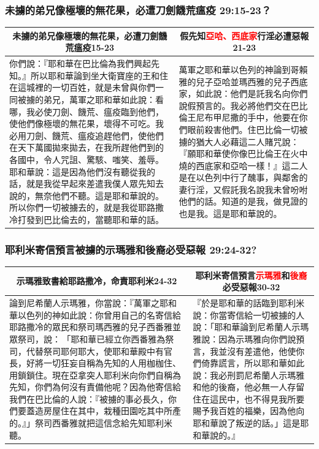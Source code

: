 \subsubsection{未擄的弟兄像極壞的無花果，必遭刀劍饑荒瘟疫 29:15-23？}
\begin{table}[H]
\centering
\begin{tabular}{p{9.75cm}|p{7.50cm}}\hline\hline
\multicolumn{1}{c|}{未擄的弟兄像極壞的無花果，必遭刀劍饑荒瘟疫15-23}&\multicolumn{1}{c}{假先知\textcolor{red}{亞哈、西底家}行淫必遭惡報21-23}\\\hline
你們說：『耶和華在巴比倫為我們興起先知。』所以耶和華論到坐大衛寶座的王和住在這城裡的一切百姓，就是未曾與你們一同被擄的弟兄，萬軍之耶和華如此說：看哪，我必使刀劍、饑荒、瘟疫臨到他們，使他們像極壞的無花果，壞得不可吃。我必用刀劍、饑荒、瘟疫追趕他們，使他們在天下萬國拋來拋去，在我所趕他們到的各國中，令人咒詛、驚駭、嗤笑、羞辱。耶和華說：這是因為他們沒有聽從我的話，就是我從早起來差遣我僕人眾先知去說的，無奈他們不聽。這是耶和華說的。所以你們一切被擄去的，就是我從耶路撒冷打發到巴比倫去的，當聽耶和華的話。
&萬軍之耶和華以色列的神論到哥賴雅的兒子亞哈並瑪西雅的兒子西底家，如此說：他們是託我名向你們說假預言的。我必將他們交在巴比倫王尼布甲尼撒的手中，他要在你們眼前殺害他們。住巴比倫一切被擄的猶大人必藉這二人賭咒說：『願耶和華使你像巴比倫王在火中燒的西底家和亞哈一樣！』這二人是在以色列中行了醜事，與鄰舍的妻行淫，又假託我名說我未曾吩咐他們的話。知道的是我，做見證的也是我。這是耶和華說的。\\\hline
\end{tabular}
\end{table}

\subsubsection{耶利米寄信預言被擄的示瑪雅和後裔必受惡報 29:24-32?}
\begin{table}[H]
\centering
\begin{tabular}{p{}|p{7.0cm}}\hline\hline
\multicolumn{1}{c|}{示瑪雅致書給耶路撒冷，命責耶利米24-32}&\multicolumn{1}{c}{耶利米寄信預言\textcolor{red}{示瑪雅}和\textcolor{red}{後裔}必受惡報30-32}\\\hline
論到尼希蘭人示瑪雅，你當說：『萬軍之耶和華以色列的神如此說：你曾用自己的名寄信給耶路撒冷的眾民和祭司瑪西雅的兒子西番雅並眾祭司，說： 「耶和華已經立你西番雅為祭司，代替祭司耶何耶大，使耶和華殿中有官長，好將一切狂妄自稱為先知的人用枷枷住、用鎖鎖住。現在亞拿突人耶利米向你們自稱為先知，你們為何沒有責備他呢？因為他寄信給我們在巴比倫的人說：『被擄的事必長久，你們要蓋造房屋住在其中，栽種田園吃其中所產的。』」祭司西番雅就把這信念給先知耶利米聽。
&『於是耶和華的話臨到耶利米說：你當寄信給一切被擄的人說：「耶和華論到尼希蘭人示瑪雅說：因為示瑪雅向你們說預言，我並沒有差遣他，他使你們倚靠謊言，所以耶和華如此說：我必刑罰尼希蘭人示瑪雅和他的後裔，他必無一人存留住在這民中，也不得見我所要賜予我百姓的福樂，因為他向耶和華說了叛逆的話。」這是耶和華說的。』\\\hline
\end{tabular}
\end{table}




